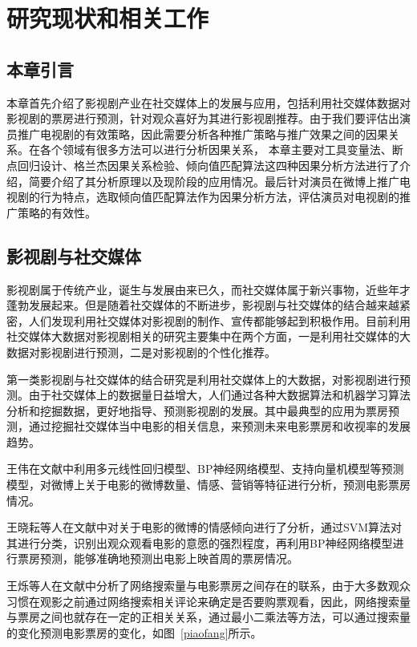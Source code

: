 \chapter{研究现状和相关工作}

\section{本章引言}

本章首先介绍了影视剧产业在社交媒体上的发展与应用，包括利用社交媒体数据对影视剧的票房进行预测，针对观众喜好为其进行影视剧推荐。由于我们要评估出演员推广电视剧的有效策略，因此需要分析各种推广策略与推广效果之间的因果关系。在各个领域有很多方法可以进行分析因果关系，
本章主要对工具变量法、断点回归设计、格兰杰因果关系检验、倾向值匹配算法这四种因果分析方法进行了介绍，简要介绍了其分析原理以及现阶段的应用情况。最后针对演员在微博上推广电视剧的行为特点，选取倾向值匹配算法作为因果分析方法，评估演员对电视剧的推广策略的有效性。

\section{影视剧与社交媒体}

影视剧属于传统产业，诞生与发展由来已久，而社交媒体属于新兴事物，近些年才蓬勃发展起来。但是随着社交媒体的不断进步，影视剧与社交媒体的结合越来越紧密，人们发现利用社交媒体对影视剧的制作、宣传都能够起到积极作用。目前利用社交媒体大数据对影视剧相关的研究主要集中在两个方面，一是利用社交媒体的大数据对影视剧进行预测，二是对影视剧的个性化推荐。

第一类影视剧与社交媒体的结合研究是利用社交媒体上的大数据，对影视剧进行预测。由于社交媒体上的数据量日益增大，人们通过各种大数据算法和机器学习算法分析和挖掘数据，更好地指导、预测影视剧的发展。其中最典型的应用为票房预测，通过挖掘社交媒体当中电影的相关信息，来预测未来电影票房和收视率的发展趋势。

王伟在文献\cite{王伟2015基于微博数据的电影票房预测研究}中利用多元线性回归模型、BP神经网络模型、支持向量机模型等预测模型，对微博上关于电影的微博数量、情感、营销等特征进行分析，预测电影票房情况。

王晓耘等人在文献\cite{王晓耘2016基于微博的电影首映周票房预测建模}中对关于电影的微博的情感倾向进行了分析，通过SVM算法对其进行分类，识别出观众观看电影的意愿的强烈程度，再利用BP神经网络模型进行票房预测，能够准确地预测出电影上映首周的票房情况。

王烁等人在文献\cite{王炼2014基于网络搜索的票房预测模型}中分析了网络搜索量与电影票房之间存在的联系，由于大多数观众习惯在观影之前通过网络搜索相关评论来确定是否要购票观看，因此，网络搜索量与票房之间也就存在一定的正相关关系，通过最小二乘法等方法，可以通过搜索量的变化预测电影票房的变化，如图~\ref{piaofang}所示。

